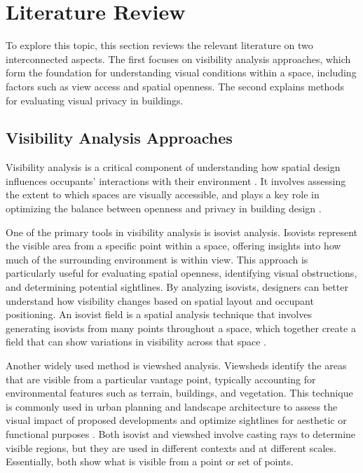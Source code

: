 \documentclass[final,3p,times,review]{elsarticle}
\begin{document}
\section{Literature Review}

To explore this topic, this section reviews the relevant literature on two interconnected aspects. The first focuses on visibility analysis approaches, which form the foundation for understanding visual conditions within a space, including factors such as view access and spatial openness. The second explains methods for evaluating visual privacy in buildings.

\subsection{Visibility Analysis Approaches}
Visibility analysis is a critical component of understanding how spatial design influences occupants' interactions with their environment \cite{askarizad2020}. It involves assessing the extent to which spaces are visually accessible, and plays a key role in optimizing the balance between openness and privacy in building design \cite{inglis2022}.

One of the primary tools in visibility analysis is isovist analysis. Isovists represent the visible area from a specific point within a space, offering insights into how much of the surrounding environment is within view. This approach is particularly useful for evaluating spatial openness, identifying visual obstructions, and determining potential sightlines. By analyzing isovists, designers can better understand how visibility changes based on spatial layout and occupant positioning. An isovist field is a spatial analysis technique that involves generating isovists from many points throughout a space, which together create a field that can show variations in visibility across that space \cite{ benedikt1979,turner2001, hosseini2022}.

Another widely used method is viewshed analysis. Viewsheds identify the areas that are visible from a particular vantage point, typically accounting for environmental features such as terrain, buildings, and vegetation\cite{inglis2022}. This technique is commonly used in urban planning and landscape architecture to assess the visual impact of proposed developments and optimize sightlines for aesthetic or functional purposes \cite{misthos2019, gillings2020,stein2022}. Both isovist and viewshed involve casting rays to determine visible regions, but they are used in different contexts and at different scales. Essentially, both show what is visible from a point or set of points\cite{cavaglia2024}.
\end{document}
